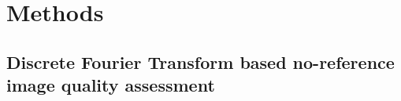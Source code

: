 


\section{Methods}

\subsection{Discrete Fourier Transform based no-reference image quality assessment}



